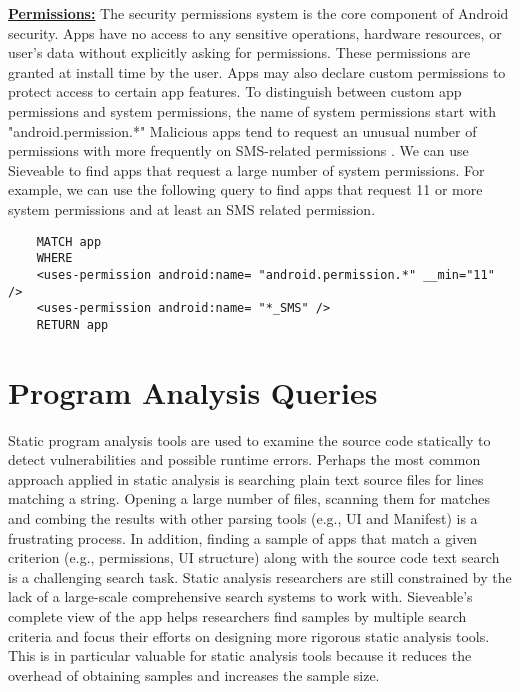 \underline{\textbf{Permissions:}}
The security permissions system is the core component of Android security.
Apps have no access to any sensitive operations, hardware resources, or user's data without explicitly asking for permissions. These permissions are granted at install time by the user.
Apps may also declare custom permissions to protect access to certain app features.
To distinguish between custom app permissions and system permissions, the name of system permissions start with "android.permission.*"
Malicious apps tend to request an unusual number of permissions with more frequently on SMS-related permissions \cite{zhou_2012_SP_dissecting}.
We can use Sieveable to find apps that request a large number of system permissions.
For example, we can use the following query to find apps that request 11 or more system permissions and at least an SMS related permission.

\begin{verbatim}
	MATCH app
	WHERE
	<uses-permission android:name= "android.permission.*" __min="11" />
	<uses-permission android:name= "*_SMS" />
	RETURN app
\end{verbatim}

\section{Program Analysis Queries}
Static program analysis tools are used to examine the source code statically to detect vulnerabilities and possible runtime errors.
Perhaps the most common approach applied in static analysis is searching plain text source files for lines matching a string.
Opening a large number of files, scanning them for matches and combing the results with other parsing tools (e.g., UI and Manifest) is a frustrating process. 
In addition, finding a sample of apps that match a given criterion (e.g., permissions, UI structure) along with the source code text search is a challenging search task.
Static analysis researchers are still constrained by the lack of a large-scale comprehensive search systems to work with.
Sieveable's complete view of the app helps researchers find samples by multiple search criteria and focus their efforts on designing more rigorous static analysis tools.
This is in particular valuable for static analysis tools because it reduces the overhead of obtaining samples and increases the sample size.

